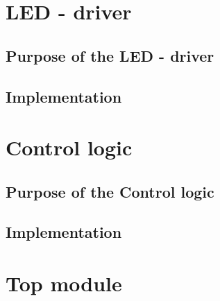 \documentclass[10pt,a4paper]{article}
\begin{document}
\section{LED - driver}
\subsection{Purpose of the LED - driver}
\subsection{Implementation}

\section{Control logic}
\subsection{Purpose of the Control logic}
\subsection{Implementation}

\section{Top module}
\end{document}
